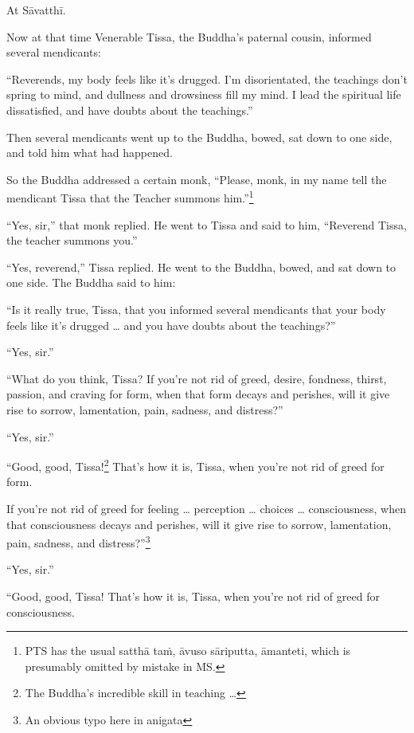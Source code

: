 \documentclass[12pt,openany]{book}%
\begin{document}
At \textsanskrit{Sāvatthī}. 

Now at that time Venerable Tissa, the Buddha’s paternal cousin, informed several mendicants: 

“Reverends, my body feels like it’s drugged. I’m disorientated, the teachings don’t spring to mind, and dullness and drowsiness fill my mind. I lead the spiritual life dissatisfied, and have doubts about the teachings.” 

Then several mendicants went up to the Buddha, bowed, sat down to one side, and told him what had happened. 

So the Buddha addressed a certain monk, “Please, monk, in my name tell the mendicant Tissa that the Teacher summons him.”\footnote{PTS has the usual \textsanskrit{satthā} \textsanskrit{taṁ}, \textsanskrit{āvuso} \textsanskrit{sāriputta}, \textsanskrit{āmanteti}, which is presumably omitted by mistake in MS. } 

“Yes, sir,” that monk replied. He went to Tissa and said to him, “Reverend Tissa, the teacher summons you.” 

“Yes, reverend,” Tissa replied. He went to the Buddha, bowed, and sat down to one side. The Buddha said to him: 

“Is it really true, Tissa, that you informed several mendicants that your body feels like it’s drugged … and you have doubts about the teachings?” 

“Yes, sir.” 

“What do you think, Tissa? If you’re not rid of greed, desire, fondness, thirst, passion, and craving for form, when that form decays and perishes, will it give rise to sorrow, lamentation, pain, sadness, and distress?” 

“Yes, sir.” 

“Good, good, Tissa!\footnote{The Buddha’s incredible skill in teaching … } That’s how it is, Tissa, when you’re not rid of greed for form. 

If you’re not rid of greed for feeling … perception … choices … consciousness, when that consciousness decays and perishes, will it give rise to sorrow, lamentation, pain, sadness, and distress?”\footnote{An obvious typo here in anigata } 

“Yes, sir.” 

“Good, good, Tissa! That’s how it is, Tissa, when you’re not rid of greed for consciousness. 
\end{document}
